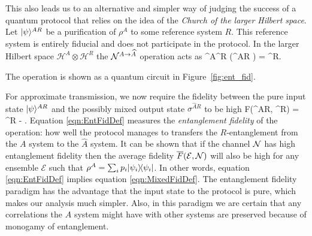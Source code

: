 \documentclass[aps,11pt,twoside,letterpaper]{article}
\def\E{\mathcal{E}}
\def\cH{\mathcal{H}}
\theoremstyle{plain}
\theoremstyle{definition}
\begin{document}
			This also leads us to an alternative and simpler way of judging the success of a quantum protocol 
			that relies on the idea of the \emph{Church of the larger Hilbert space}.
			Let $| \psi \rangle^{AR}$ be a purification of $\rho^A$ to some reference system $R$. 
			This reference system is entirely fiducial and does not participate in the protocol.
			In the larger Hilbert space $\cH^A\otimes\cH^R$ the ${\cal N}^{A \to \widehat{A}}$ operation acts as
			\be
				\cN^{A\to {}}\!\!\otimes\!\id^R \!\left(\proj{\psi}^{AR} \right) = \sigma^{R}.
			\ee
			
			\noindent The operation is shown as a quantum circuit in Figure~\ref{fig:ent_fid}.
			
			For approximate transmission, we now require the fidelity between the pure input state $| \psi \rangle^{AR}$ 
			and the possibly mixed output state $\sigma^{\widehat{A}R}$ to be high
			\be	\label{eqn:EntFidDef}
				F(\ket{\psi}^{AR}, \sigma^{R}) 
					= 		 \sigma^{R} 
					 - \epsilon.
			\ee
			Equation \eqref{eqn:EntFidDef} measures the \emph{entanglement fidelity} of the operation: 
			how well the protocol manages to transfers the $R$-entanglement from the $A$ system to the $\widehat{A}$
			system. 
			It can be shown \cite{EntFid} that if the channel ${\cal N}$ has high entanglement fidelity then the 
			average fidelity  $\bar{F}(\E, \cN)$ will also be high for any ensemble $\E$ such that 
			$\rho^A=\sum_i p_i | \psi_i \rangle\!\langle \psi_i |$.
			In other words, equation \eqref{eqn:EntFidDef} implies equation \eqref{eqn:MixedFidDef}.
			The entanglement fidelity paradigm has the advantage that the input state to the protocol is
			pure, which makes our analysis much simpler.
			Also, in this paradigm we are certain that any correlations the $A$ system might have with other systems 
			are preserved because of monogamy of entanglement.
					
\end{document}
